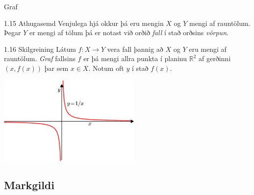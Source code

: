 \documentclass[icelandic,a4paper,12pt]{article}
\newcommand{\R}{{\mathbb  R}}
\begin{document}
\begin{frame}{Graf}
\begin{block}{1.15 Athugasemd}
 Venjulega hjá okkur þá eru mengin $X$ og $Y$ mengi af rauntölum. Þegar $Y$ er
mengi af tölum þá er notast við orðið \emph{fall} í stað orðsins 
\emph{vörpun}.
\end{block}

\pause

\begin{block}{1.16 Skilgreining}
Látum $f:X \to Y$ vera fall þannig að $X$ og $Y$ eru mengi 
af rauntölum. \emph{Graf} fallsins $f$ er þá mengi allra punkta í planinu
$\R^2$ af gerðinni $(x,f(x))$ þar sem $x\in X$. 
Notum oft $y$ í stað $f(x)$.
\end{block}

\begin{center}
\includegraphics[width=7cm,keepaspectratio=true]{./myndir/kafli01/02_Graf.png}
\end{center}

\end{frame}

\subsection*{Markgildi}
\end{document}
